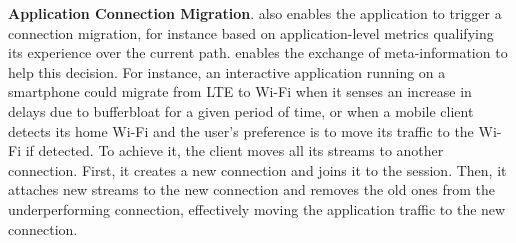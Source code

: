 \textbf{Application Connection Migration}. \tcpls also enables the
application to trigger a connection migration, for instance based on application-level metrics qualifying its experience over the current path.
\tcpls enables the exchange of meta-information to help this
decision.
For instance, an interactive application running on a smartphone could migrate 
from
LTE to Wi-Fi when it senses an increase in delays due to bufferbloat for a
given period of time, or when a mobile client detects its home Wi-Fi and the
user's preference is to move its traffic to the Wi-Fi if detected.
To achieve it, the client moves all its \tcpls streams to another \tcp
connection.
First, it creates a new \tcp connection and joins it to the
\tcpls
session. Then, %
it attaches new streams to the new
connection
and removes the old ones from the underperforming connection, effectively moving
the application traffic to the new connection.


